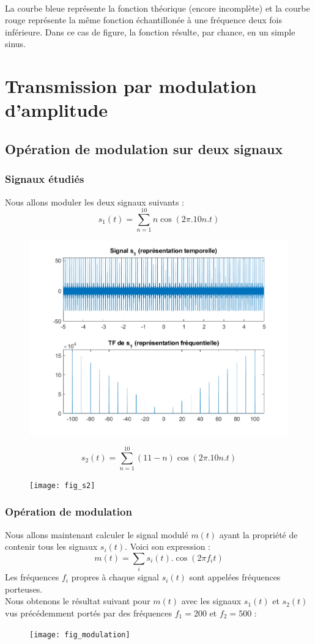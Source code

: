\documentclass{article}
\begin{document}
\paragraph{}
La courbe bleue représente la fonction théorique (encore incomplète) et la courbe rouge représente la même fonction échantillonée à une fréquence deux fois inférieure. Dans ce cas de figure, la fonction résulte, par chance, en un simple sinus.

\newpage

\section{Transmission par modulation d'amplitude}
\subsection{Opération de modulation sur deux signaux}
\subsubsection{Signaux étudiés}
Nous allons moduler les deux signaux suivants :
$$ s_1(t) = \sum_{n=1}^{10}n\cos(2\pi.10n.t)$$
\begin{figure}[h]
\includegraphics[scale=0.5]{fig_s1}
\centering
\end{figure}
$$ s_2(t)=\sum_{n=1}^{10}(11-n)\cos(2\pi.10n.t)$$
\begin{figure}[h]
\texttt{[image: fig\_s2]}
\centering
\end{figure}

\subsubsection{Opération de modulation}
Nous allons maintenant calculer le signal modulé $m(t)$ ayant la propriété de contenir tous les signaux $s_i(t)$. Voici son expression :
$$m(t)=\sum_{i}s_i(t).\cos(2\pi f_i t)$$
Les fréquences $f_i$ propres à chaque signal $s_i(t)$ sont appelées fréquences porteuses. \\
Nous obtenons le résultat suivant pour $m(t)$ avec les signaux $s_1(t)$ et $s_2(t)$ vus précédemment portés par des fréquences $f_1=200$ et $f_2=500$ :
\begin{figure}[h]
\texttt{[image: fig\_modulation]}
\centering
\end{figure}
\end{document}
